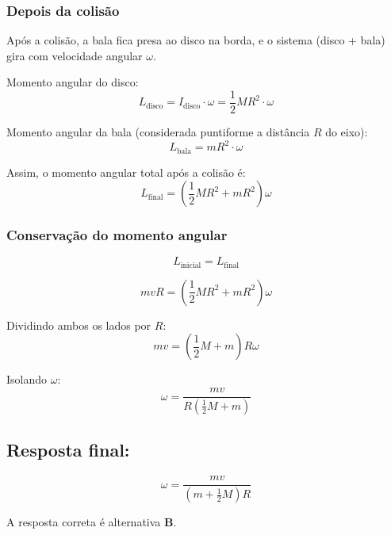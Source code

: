 \begin{flushleft}
\subsubsection*{Depois da colisão}
Após a colisão, a bala fica presa ao disco na borda, e o sistema (disco + bala) gira com velocidade angular \(\omega\).

Momento angular do disco:
\[
L_{\text{disco}} = I_{\text{disco}} \cdot \omega = \frac{1}{2} M R^2 \cdot \omega
\]

Momento angular da bala (considerada puntiforme a distância \(R\) do eixo):
\[
L_{\text{bala}} = m R^2 \cdot \omega
\]

Assim, o momento angular total após a colisão é:
\[
L_{\text{final}} = \left( \frac{1}{2} M R^2 + m R^2 \right) \omega
\]

\subsubsection*{Conservação do momento angular}
\[
L_{\text{inicial}} = L_{\text{final}}
\]

\[
m v R = \left( \frac{1}{2} M R^2 + m R^2 \right) \omega
\]

Dividindo ambos os lados por \(R\):
\[
m v = \left( \frac{1}{2} M + m \right) R \omega
\]

Isolando \(\omega\):
\[
\omega = \frac{m v}{R \left( \frac{1}{2} M + m \right)}
\]

\subsection*{Resposta final:}
\[
\boxed{
\omega = \frac{m v}{\left(m + \frac{1}{2} M\right)R}
}
\]

A resposta correta é alternativa \colorbox{green!50}{\textbf{B}}.
\end{flushleft}

